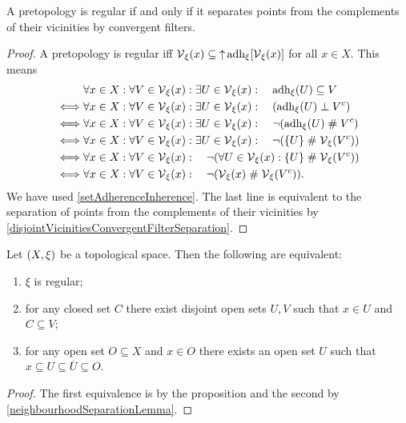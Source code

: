\begin{proposition} \label{pretopologicalRegularity}
A pretopology is regular \textup{if and only if} it separates points from the complements of their vicinities by convergent filters.
\end{proposition}
\begin{proof}
A pretopology is regular iff $\operatorname{\mathcal{V}}_\xi(x)\subseteq \operatorname{\uparrow}\operatorname{adh}_\xi[\operatorname{\mathcal{V}}_\xi(x)]$ for all $x\in X$. This means
\begin{align*}
& \forall x\in X: \forall V\in \operatorname{\mathcal{V}}_\xi(x): \exists U \in \operatorname{\mathcal{V}}_\xi(x): \quad \operatorname{adh}_\xi(U) \subseteq V \\
\iff& \forall x\in X: \forall V\in \operatorname{\mathcal{V}}_\xi(x): \exists U \in \operatorname{\mathcal{V}}_\xi(x): \quad (\operatorname{adh}_\xi(U) \perp V^c) \\
\iff& \forall x\in X: \forall V\in \operatorname{\mathcal{V}}_\xi(x): \exists U \in \operatorname{\mathcal{V}}_\xi(x): \quad \neg(\operatorname{adh}_\xi(U) \mathrel{\#} V^c) \\
\iff& \forall x\in X: \forall V\in \operatorname{\mathcal{V}}_\xi(x): \exists U \in \operatorname{\mathcal{V}}_\xi(x): \quad \neg(\{U\} \mathrel{\#} \operatorname{\mathcal{V}}_\xi(V^c)) \\
\iff& \forall x\in X: \forall V\in \operatorname{\mathcal{V}}_\xi(x): \quad \neg(\forall U \in \operatorname{\mathcal{V}}_\xi(x):\{U\} \mathrel{\#} \operatorname{\mathcal{V}}_\xi(V^c)) \\
\iff& \forall x\in X: \forall V\in \operatorname{\mathcal{V}}_\xi(x): \quad \neg(\operatorname{\mathcal{V}}_\xi(x) \mathrel{\#} \operatorname{\mathcal{V}}_\xi(V^c)).
\end{align*}
We have used \ref{setAdherenceInherence}.
The last line is equivalent to the separation of points from the complements of their vicinities by \ref{disjointVicinitiesConvergentFilterSeparation}.
\end{proof}

\begin{corollary} \label{topologicalRegularity}
Let $\left( X,\xi \right)$ be a topological space. Then the following are equivalent:
\begin{enumerate}
\item $\xi$ is regular;
\item for any closed set $C$ there exist disjoint open sets $U,V$ such that $x\in U$ and $C\subseteq V$;
\item for any open set $O\subseteq X$ and $x\in O$ there exists an open set $U$ such that $x\subseteq U\subseteq \overline{U} \subseteq O$.
\end{enumerate}
\end{corollary}
\begin{proof}
The first equivalence is by the proposition and the second by \ref{neighbourhoodSeparationLemma}.
\end{proof}

